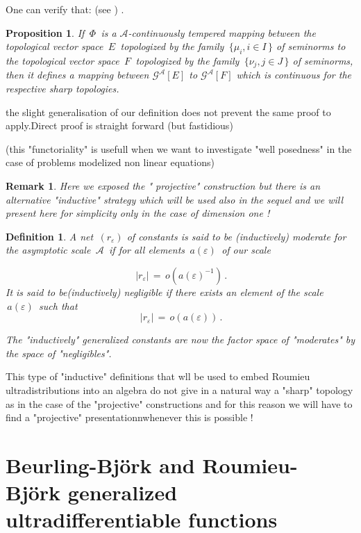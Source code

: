\documentclass[12pt,a4paper]{amsart}
\newtheorem{proposition}[theorem]{Proposition}
\newtheorem{definition}[theorem]{Definition}
\newtheorem{remark}[theorem]{Remark}
\begin{document}
One can verify that: (see \cite{D.S.1}) .
\begin{proposition}

If $\,\Phi\,$ is a $\mathcal{A}$-continuously tempered mapping between the topological vector space $\,E\,$ topologized by the family $\,\{\mu_i,i\in I\,\}$ of seminorms to the topological vector space $\,F\,$ topologized by the family 
$\,\{\nu_j,j\in J\,\}$ of seminorms, then it defines 
 a mapping between $\mathcal{G}^{\mathcal{A}}[E]$
 to $\mathcal{G}^{\mathcal{A}}[F]$ which is continuous for the respective sharp topologies.
\end{proposition}
the slight generalisation of our definition does not prevent the same proof to apply.Direct proof is straight forward (but fastidious)



 (this "functoriality" is usefull when we want to investigate "well posedness" in the case of problems modelized non linear equations)


\begin{remark}
Here we exposed the  " projective" construction but there is an alternative "inductive" strategy which will be used also in the sequel and we will present here for simplicity  only 
in the case of dimension one !
\end{remark}

 \begin{definition}
A net $\,(r_\varepsilon)$ of constants is said to be (inductively) moderate for the asymptotic  scale $\,\mathcal{A}\,$ 
if for all elements   $\,a(\varepsilon)\,$ of our scale
 
 $$\,|r_\varepsilon| \,=\,o(a(\varepsilon)^{-1})\,.$$
 It is said to be(inductively) negligible if there exists an element of the scale $\,a(\varepsilon)\,$
  such that
  $$\, |r_\varepsilon| \,=\,o(a(\varepsilon))\,  .$$
  
  The "inductively" generalized constants are now the factor space of "moderates" by the space of "negligibles".
    \end{definition}
 This type of "inductive" definitions that wll be used to embed Roumieu ultradistributions into an algebra do not give in a natural way a "sharp" topology as in the case of the "projective" constructions and for this reason we will have to find a "projective" presentationnwhenever this is possible !
 
  \section{Beurling-Bj\"{o}rk and Roumieu- Bj\"ork  generalized ultradifferentiable functions}
\end{document}
